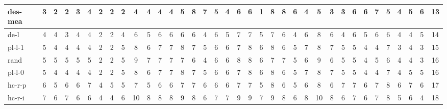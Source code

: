 \begin{tabular}{ l | c|c|c|c|c|c|c|c|c|c|c|c|c|c|c|c|c|c|c|c|c|c|c|c|c|c|c|c|c|c|c|c|c|c | c }
des-mea  & 3 & 2 & 2 & 3 & 4 & 2 & 2 & 2 & 4 & 4 & 4 & 4 & 5 & 8 & 7 & 5 & 4 & 6 & 6 & 1 & 8 & 8 & 6 & 4 & 5 & 3 & 3 & 6 & 6 & 7 & 5 & 4 & 5 & 6& 13\\\hline
de-l  & 4 & 4 & 3 & 4 & 4 & 2 & 2 & 4 & 6 & 5 & 6 & 6 & 6 & 6 & 4 & 6 & 5 & 7 & 7 & 5 & 7 & 6 & 4 & 6 & 8 & 6 & 4 & 6 & 5 & 6 & 6 & 4 & 4 & 5& 14\\\hline
pl-l-1  & 5 & 4 & 4 & 4 & 4 & 2 & 2 & 5 & 8 & 6 & 7 & 7 & 8 & 7 & 5 & 6 & 6 & 7 & 8 & 6 & 8 & 6 & 5 & 7 & 8 & 7 & 5 & 5 & 4 & 4 & 7 & 3 & 4 & 3& 15\\\hline
rand  & 5 & 5 & 5 & 5 & 5 & 2 & 2 & 5 & 9 & 7 & 7 & 7 & 7 & 6 & 4 & 6 & 6 & 8 & 8 & 6 & 7 & 7 & 5 & 6 & 9 & 6 & 5 & 5 & 4 & 5 & 6 & 4 & 4 & 3& 16\\\hline
pl-l-0  & 5 & 4 & 4 & 4 & 4 & 2 & 2 & 5 & 8 & 6 & 7 & 7 & 8 & 7 & 5 & 6 & 6 & 7 & 8 & 6 & 8 & 6 & 5 & 7 & 8 & 7 & 5 & 5 & 4 & 4 & 7 & 4 & 5 & 5& 16\\\hline
hc-r-p  & 6 & 5 & 6 & 6 & 7 & 4 & 5 & 5 & 7 & 5 & 6 & 6 & 7 & 7 & 6 & 6 & 6 & 7 & 7 & 5 & 8 & 6 & 5 & 6 & 8 & 6 & 7 & 7 & 6 & 7 & 8 & 6 & 7 & 6& 17\\\hline
hc-r-i  & 7 & 6 & 7 & 6 & 6 & 4 & 4 & 6 & 10 & 8 & 8 & 8 & 9 & 8 & 6 & 7 & 7 & 9 & 9 & 7 & 9 & 8 & 6 & 8 & 10 & 8 & 6 & 7 & 6 & 7 & 8 & 5 & 6 & 4& 18
\end{tabular}
